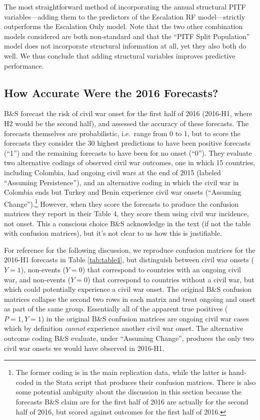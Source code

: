 \documentclass[
]{article}
\begin{document}
The most straightforward method of incorporating the annual structural PITF variables---adding them to the predictors of the Escalation RF model---strictly outperforms the Escalation Only model. Note that the two other combination models considered are both non-standard and that the ``PITF Split Population'' model does not incorporate structural information at all, yet they also both do well. We thus conclude that adding structural variables improves predictive performance.

\hypertarget{how-accurate-were-the-2016-forecasts}{%
\subsection{How Accurate Were the 2016 Forecasts?}\label{how-accurate-were-the-2016-forecasts}}

B\&S forecast the risk of civil war onset for the first half of 2016 (2016-H1, where H2 would be the second half), and assessed the accuracy of these forecasts. The forecasts themselves are probabilistic, i.e.~range from 0 to 1, but to score the forecasts they consider the 30 highest predictions to have been positive forecasts (``1'') and the remaining forecasts to have been for no onset (``0''). They evaluate two alternative codings of observed civil war outcomes, one in which 15 countries, including Colombia, had ongoing civil wars at the end of 2015 (labeled ``Assuming Persistence''), and an alternative coding in which the civil war in Colombia ends but Turkey and Benin experience civil war onsets (``Assuming Change'').\footnote{\label{fn:leadDV}The former coding is in the main replication data, while the latter is hand-coded in the Stata script that produces their confusion matrices. There is also some potential ambiguity about the discussion in this section because the forecasts B\&S claim are for the first half of 2016 are actually for the second half of 2016, but scored against outcomes for the first half of 2016.} However, when they score the forecasts to produce the confusion matrices they report in their Table 4, they score them using civil war incidence, not onset. This a conscious choice B\&S acknowledge in the text (if not the table with confusion matrices), but it's not clear to us how this is justifiable.

For reference for the following discussion, we reproduce confusion matrices for the 2016-H1 forecasts in Table \ref{tab:table4}, but distinguish between civil war onsets (\(Y=1\)), non-events (\(Y=0\)) that correspond to countries with an ongoing civil war, and non-events (\(Y=0\)) that correspond to countries without a civil war, but which could potentially experience a civil war onset. The original B\&S confusion matrices collapse the second two rows in each matrix and treat ongoing and onset as part of the same group. Essentially all of the apparent true positives (\(P=1, Y=1\)) in the original B\&S confusion matrices are ongoing civil war cases which by definition \emph{cannot} experience another civil war onset. The alternative outcome coding B\&S evaluate, under ``Assuming Change'', produces the only two civil war onsets we would have observed in 2016-H1.
\end{document}
